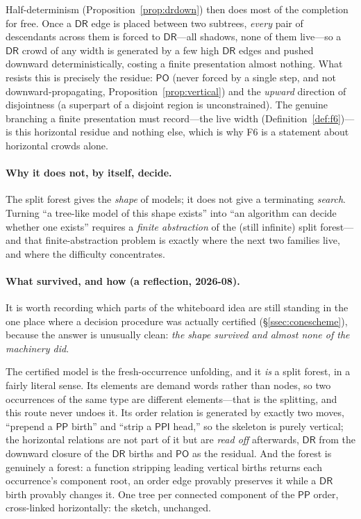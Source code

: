 \documentclass[11pt]{article}
\newcommand{\DR}{\mathsf{DR}}
\newcommand{\PO}{\mathsf{PO}}
\newcommand{\PP}{\mathsf{PP}}
\newcommand{\PPI}{\mathsf{PPI}}
\theoremstyle{plain}
\theoremstyle{definition}
\begin{document}
Half-determinism (Proposition~\ref{prop:drdown}) then does most of the
completion for free. Once a $\DR$ edge is placed between two subtrees,
\emph{every} pair of descendants across them is forced to $\DR$---all
shadows, none of them live---so a $\DR$ crowd of any width is generated by a
few high $\DR$ edges and pushed downward deterministically, costing a finite
presentation almost nothing. What resists this is precisely the residue:
$\PO$ (never forced by a single step, and not downward-propagating,
Proposition~\ref{prop:vertical}) and
the \emph{upward} direction of disjointness (a superpart of a disjoint
region is unconstrained). The genuine branching a finite presentation must
record---the live width (Definition~\ref{def:f6})---is this horizontal
residue and nothing else, which is why F6 is a statement about horizontal
crowds alone.

\paragraph{Why it does not, by itself, decide.} The split forest gives the
\emph{shape} of models; it does not give a terminating \emph{search}.
Turning ``a tree-like model of this shape exists'' into ``an algorithm can
decide whether one exists'' requires a \emph{finite abstraction} of the
(still infinite) split forest---and that finite-abstraction problem is
exactly where the next two families live, and where the difficulty
concentrates.

\paragraph{What survived, and how (a reflection, 2026-08).}
\label{par:splitforest-survived}
It is worth recording which parts of the whiteboard idea are still standing in
the one place where a decision procedure was actually certified
(\S\ref{ssec:conescheme}), because the answer is unusually clean: \emph{the
shape survived and almost none of the machinery did}.

The certified model is the fresh-occurrence unfolding, and it \emph{is} a split
forest, in a fairly literal sense. Its elements are demand words rather than
nodes, so two occurrences of the same type are different elements---that is the
splitting, and this route never undoes it. Its order relation is generated by
exactly two moves, ``prepend a $\PP$ birth'' and ``strip a $\PPI$ head,''
so the skeleton is purely vertical; the horizontal relations are not part of it
but are \emph{read off} afterwards, $\DR$ from the downward closure of the
$\DR$ births and $\PO$ as the residual. And the forest is genuinely a forest: a
function stripping leading vertical births returns each occurrence's component
root, an order edge provably preserves it while a $\DR$ birth provably changes
it. One tree per connected component of the $\PP$ order, cross-linked
horizontally: the sketch, unchanged.
\end{document}
